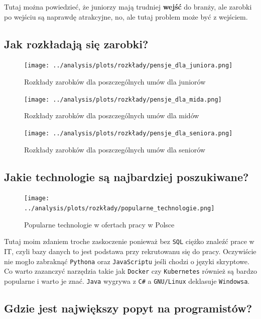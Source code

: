 \documentclass[a4paper]{article}
\begin{document}
\quad Tutaj można powiedzieć, że juniorzy mają trudniej \textbf{wejść} do branży, ale zarobki po wejściu są naprawdę atrakcyjne,
no, ale tutaj problem może być z wejściem.


\subsection{Jak rozkładają się zarobki?}

\begin{figure}[H]
    \centering
    \texttt{[image: ../analysis/plots/rozkłady/pensje\_dla\_juniora.png]}
    \caption{Rozkłady zarobków dla poszczególnych umów dla juniorów}
\end{figure}

\begin{figure}[H]
    \centering
    \texttt{[image: ../analysis/plots/rozkłady/pensje\_dla\_mida.png]}
    \caption{Rozkłady zarobków dla poszczególnych umów dla midów}
\end{figure}

\begin{figure}[H]
    \centering
    \texttt{[image: ../analysis/plots/rozkłady/pensje\_dla\_seniora.png]}
    \caption{Rozkłady zarobków dla poszczególnych umów dla seniorów}
\end{figure}


\subsection{Jakie technologie są najbardziej poszukiwane?}

\begin{figure}[H]
    \centering
    \texttt{[image: ../analysis/plots/rozkłady/popularne\_technologie.png]}
    \caption{Popularne technologie w ofertach pracy w Polsce}
\end{figure}

\quad Tutaj moim zdaniem troche zaskoczenie ponieważ bez \texttt{SQL} ciężko znaleźć prace w IT, czyli
bazy danych to jest podstawa przy rekrutowanu się do pracy. Oczywiście nie mogło zabraknąć \texttt{Pythona} oraz \texttt{JavaScriptu} jeśli chodzi o języki skryptowe.
Co warto zazanczyć narzędzia takie jak \texttt{Docker} czy \texttt{Kubernetes} również są bardzo popularne i warto je znać. \texttt{Java} wygrywa z \texttt{C\#} a \texttt{GNU/Linux} deklasuje \texttt{Windowsa}.


\subsection{Gdzie jest największy popyt na programistów?}
\end{document}
